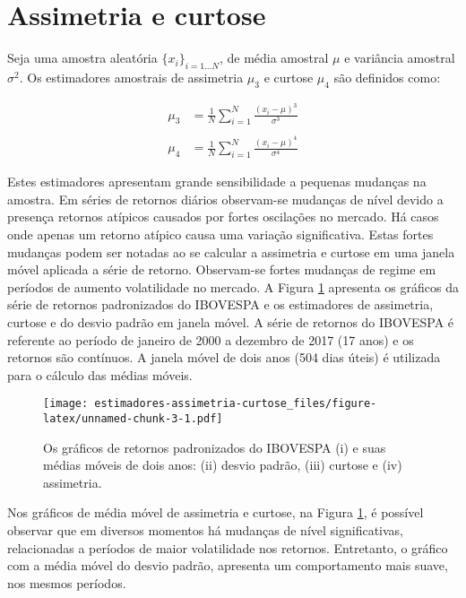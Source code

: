 \documentclass[]{article}
\begin{document}
\section{Assimetria e curtose}\label{assimetria-e-curtose}

Seja uma amostra aleatória \(\{x_i\}_{i=1...N}\), de média amostral
\(\mu\) e variância amostral \(\sigma^2\). Os estimadores amostrais de
assimetria \(\mu_3\) e curtose \(\mu_4\) são definidos como:

\[
\begin{split}
\mu_3 & = \frac{1}{N} \sum_{i=1}^{N} \frac{(x_i - \mu)^3}{\sigma^3} \\ \\
\mu_4 & = \frac{1}{N} \sum_{i=1}^{N} \frac{(x_i - \mu)^4}{\sigma^4}
\end{split}
\]

Estes estimadores apresentam grande sensibilidade a pequenas mudanças na
amostra. Em séries de retornos diários observam-se mudanças de nível
devido a presença retornos atípicos causados por fortes oscilações no
mercado. Há casos onde apenas um retorno atípico causa uma variação
significativa. Estas fortes mudanças podem ser notadas ao se calcular a
assimetria e curtose em uma janela móvel aplicada a série de retorno.
Observam-se fortes mudanças de regime em períodos de aumento
volatilidade no mercado. A Figura \ref{fig:skewness-kurtosis-ma}
apresenta os gráficos da série de retornos padronizados do IBOVESPA e os
estimadores de assimetria, curtose e do desvio padrão em janela móvel. A
série de retornos do IBOVESPA é referente ao período de janeiro de 2000
a dezembro de 2017 (17 anos) e os retornos são contínuos. A janela móvel
de dois anos (504 dias úteis) é utilizada para o cálculo das médias
móveis.

\begin{figure}
\centering
\texttt{[image: estimadores-assimetria-curtose\_files/figure-latex/unnamed-chunk-3-1.pdf]}
\caption{\label{fig:skewness-kurtosis-ma} Os gráficos de retornos
padronizados do IBOVESPA (i) e suas médias móveis de dois anos: (ii)
desvio padrão, (iii) curtose e (iv) assimetria.}
\end{figure}

Nos gráficos de média móvel de assimetria e curtose, na Figura
\ref{fig:skewness-kurtosis-ma}, é possível observar que em diversos
momentos há mudanças de nível significativas, relacionadas a períodos de
maior volatilidade nos retornos. Entretanto, o gráfico com a média móvel
do desvio padrão, apresenta um comportamento mais suave, nos mesmos
períodos.
\end{document}

